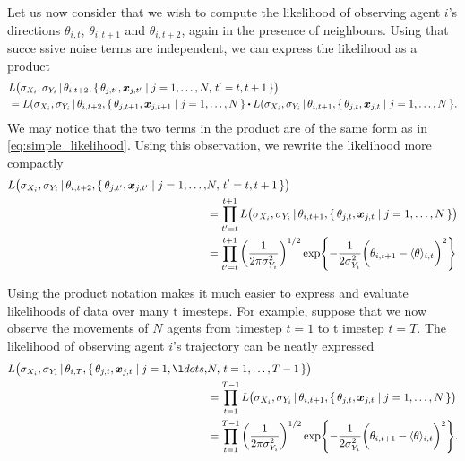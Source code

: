Let us now consider that we wish to compute the likelihood of observing agent $i$'s directions $\theta_
{i, t}$, $\theta_{i, t+1}$ and $\theta_{i, t+2}$, again in the presence of neighbours. Using that succe
ssive noise terms are independent, we can express the likelihood as a product
\begin{align*}
	& L\big(\sigma_{X_i}, \sigma_{Y_i}  \given \theta_{i, t+2},  \{\,\theta_{j, t'}, \bm{x}_{j, t'} \mid j
=1,\ldots,N, \, t'=t,t+1\,\}\big) \\
									& = L(\sigma_{X_i}, \sigma_{Y_i} \given \theta_{i, t+2}, \{\, \theta_{j, t+1}, \bm{x}_{j, t+1}
 \mid j=1,\ldots,N\,\} \bigcdot L(\sigma_{X_i}, \sigma_{Y_i} \given \theta_{i, t+1}, \{\, \theta_{j, t}
, \bm{x}_{j, t} \mid j=1,\ldots,N\,\}.
\end{align*}
We may notice that the two terms in the product are of the same form as in \cref{eq:simple_likelihood}.
 Using this observation, we rewrite the likelihood more compactly
\begin{align*}
L\big(\sigma_{X_i}, \sigma_{Y_i}  \,|\, \theta_{i, t+2},  \{\,\theta_{j, t'}, \bm{x}_{j, t'} \mid j=1,
\ldots,&N, \, t'=t,t+1\,\}\big) \\
& = \prod_{t'=t}^{t+1} L\big(\sigma_{X_i}, \sigma_{Y_i} \,|\, \theta_{i, t+1},  \{\,\theta_{j, t}, \bm
{x}_{j, t} \mid j=1,\ldots,N\,\}\big) \\
& = \prod_{t'=t}^{t+1} \bigg( \frac{1}{2\pi\sigma_{Y_i}^2} \bigg)^{1/2} \exp{-\frac{1}{2\sigma_{Y_i}^2}
 \bigg(\theta_{i, t+1} - \langle \theta \rangle_{i, t}\bigg)^2 }
\end{align*}

Using the product notation makes it much easier to express and evaluate likelihoods of data over many t
imesteps. For example, suppose that we now observe the movements of $N$ agents from timestep $t=1$ to t
imestep $t=T$. The likelihood of observing agent $i$'s trajectory can be neatly expressed
\begin{align*}
	L\big(\sigma_{X_i}, \sigma_{Y_i}  \given \theta_{i, T},  \{\,\theta_{j, t}, \bm{x}_{j, t} \mid j= 1,\l
dots,&N, \, t=1,  \ldots,T-1\,\}\big) \\
	& = \prod_{t=1}^{T-1} L\big(\sigma_{X_i}, \sigma_{Y_i} \given \theta_{i, t+1},  \{\,\theta_{j, t}, \bm
{x}_{j, t} \mid j=1,\ldots,N\,\}\big) \\
	& = \prod_{t=1}^{T-1} \bigg( \frac{1}{2\pi\sigma_{Y_i}^2} \bigg)^{1/2} \exp{-\frac{1}{2\sigma_{Y_i}^2}
 \bigg(\theta_{i, t+1} - \langle \theta \rangle_{i, t}\bigg)^2 }.
\end{align*}

